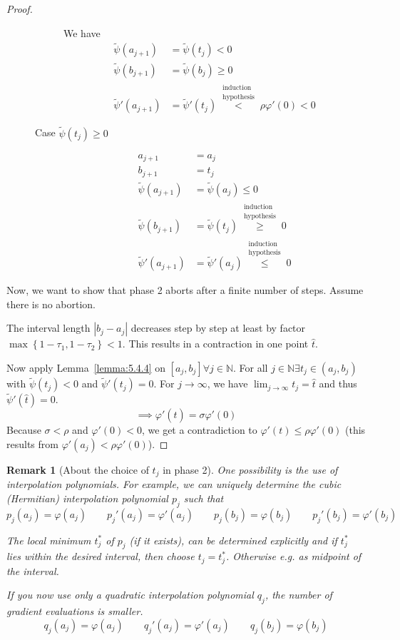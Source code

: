 \documentclass[a4paper]{article}
\numberwithin{lecref}{subsection}
\newtheorem*{Remark}{Remark}
\newcommand{\Abs}[1]{\left|#1\right|}
\newcommand{\Set}[1]{\left\{#1\right\}}
\begin{document}
\begin{proof}
\begin{description}
\begin{description}
					We have
					\begin{align*}
						\tilde\psi(a_{j+1}) &= \tilde\psi(t_j) < 0 \\
						\tilde\psi(b_{j+1}) &= \tilde\psi(b_j) \geq 0 \\
						\tilde\psi'(a_{j+1}) &= \tilde\psi'(t_j) \overset{\substack{\text{induction} \\ \text{hypothesis}}}< \rho \varphi'(0) < 0
					\end{align*}
				\item[Case $\tilde\psi(t_j) \geq 0$]
					\begin{align*}
						a_{j+1} &= a_j \\
						b_{j+1} &= t_j \\
						\tilde\psi(a_{j+1}) &= \tilde\psi(a_j) \leq 0 \\
						\tilde\psi(b_{j+1}) &= \tilde\psi(t_j) \overset{\substack{\text{induction} \\ \text{hypothesis}}}\geq 0 \\
						\tilde\psi'(a_{j+1}) &= \tilde\psi'(a_j) \overset{\substack{\text{induction} \\ \text{hypothesis}}}\leq 0
					\end{align*}
			\end{description}
	\end{description}

	Now, we want to show that phase 2 aborts after a finite number of steps.
	Assume there is no abortion.

	The interval length $\Abs{b_j - a_j}$ decreases step by step at least by factor $\max\Set{1 - \tau_1, 1 - \tau_2} < 1$.
	This results in a contraction in one point $\hat t$.

	Now apply Lemma~\ref{lemma:5.4.4} on $[a_j, b_j] \forall j \in \mathbb N$.
	For all $j \in \mathbb N \exists t_j \in (a_j, b_j)$ with $\tilde\psi(t_j) < 0$ and $\tilde\psi'(t_j) = 0$.
	For $j \to \infty$, we have $\lim_{j\to\infty} t_j = \hat t$ and thus $\tilde\psi'(\hat t) = 0$.
	\[ \implies \varphi'(\hat t) = \sigma \varphi'(0) \]
	Because $\sigma < \rho$ and $\varphi'(0) < 0$, we get a contradiction to $\varphi'(t) \leq \rho \varphi'(0)$ (this results from $\varphi'(a_j) < \rho \varphi'(0)$).
\end{proof}

\begin{Remark}[About the choice of $t_j$ in phase 2]
	One possibility is the use of interpolation polynomials.
	For example, we can uniquely determine the cubic (Hermitian) interpolation polynomial $p_j$ such that
	\[ p_j(a_j) = \varphi(a_j) \qquad p_j'(a_j) = \varphi'(a_j) \qquad p_j(b_j) = \varphi(b_j) \qquad p_j'(b_j) = \varphi'(b_j) \]

	The local minimum $t_j^*$ of $p_j$ (if it exists), can be determined explicitly and if $t_j^*$ lies within the desired interval, then choose $t_j = t_j^*$. Otherwise e.g. as midpoint of the interval.

	If you now use only a quadratic interpolation polynomial $q_j$, the number of gradient evaluations is smaller.
	\[ q_j(a_j) = \varphi(a_j) \qquad q_j'(a_j) = \varphi'(a_j) \qquad q_j(b_j) = \varphi(b_j) \]
\end{Remark}
\end{document}
